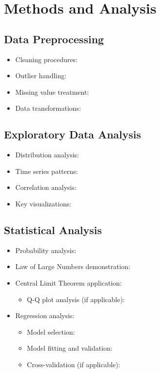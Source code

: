 \documentclass[11pt]{article}
\begin{document}
\section{Methods and Analysis}

\subsection{Data Preprocessing}
\begin{itemize}
    \item Cleaning procedures:
    \item Outlier handling:
    \item Missing value treatment:
    \item Data transformations:
\end{itemize}

\subsection{Exploratory Data Analysis}
\begin{itemize}
    \item Distribution analysis:
    \item Time series patterns:
    \item Correlation analysis:
    \item Key visualizations:
\end{itemize}

\subsection{Statistical Analysis}
\begin{itemize}
    \item Probability analysis:
    \item Law of Large Numbers demonstration:
    \item Central Limit Theorem application:
    \begin{itemize}
        \item Q-Q plot analysis (if applicable):
    \end{itemize}
    \item Regression analysis:
    \begin{itemize}
        \item Model selection:
        \item Model fitting and validation:
        \item Cross-validation (if applicable):
    \end{itemize}
\end{itemize}
\end{document}
